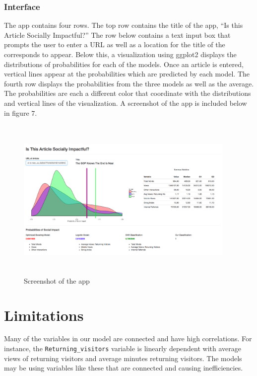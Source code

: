 \documentclass[10pt,letterpaper]{article}
\begin{document}
\hypertarget{interface}{%
\subsubsection{Interface}\label{interface}}

The app contains four rows. The top row contains the title of the app,
``Is this Article Socially Impactful?'' The row below contains a text
input box that prompts the user to enter a URL as well as a location for
the title of the corresponds to appear. Below this, a visualization
using ggplot2 displays the distributions of probabilities for each of
the models. Once an article is entered, vertical lines appear at the
probabilities which are predicted by each model. The fourth row displays
the probabilities from the three models as well as the average. The
probabilities are each a different color that coordinate with the
distributions and vertical lines of the visualization. A screenshot of
the app is included below in figure 7.

\begin{figure}
\includegraphics[width=400px,height=300px]{app} \caption{Screenshot of the app}\label{fig:unnamed-chunk-8}
\end{figure}

\hypertarget{limitations}{%
\section{Limitations}\label{limitations}}

Many of the variables in our model are connected and have high
correlations. For instance, the \texttt{Returning\_visitors} variable is
linearly dependent with average views of returning visitors and average
minutes returning visitors. The models may be using variables like these
that are connected and causing inefficiencies.
\end{document}
